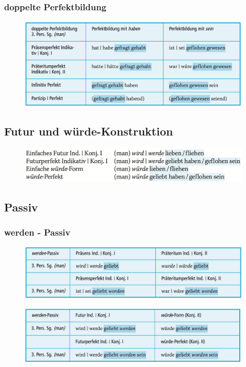 \documentclass[UTF8]{report}
\begin{document}
\subsubsection{doppelte Perfektbildung}
\begin{figure}[H]
    \centering
    \includegraphics[scale=0.55]{dp.png}
\end{figure}

\subsection{Futur und würde-Konstruktion}
\begin{figure}[H]
    \centering
    \includegraphics[scale=0.6]{Ft.png}
\end{figure}

\subsection{Passiv}
\subsubsection{werden - Passiv}
\begin{figure}[H]
    \centering
    \includegraphics[scale=0.5]{WP1.png}
\end{figure}
\begin{figure}[H]
    \centering
    \includegraphics[scale=0.6]{WP2.png}
\end{figure}
\end{document}
